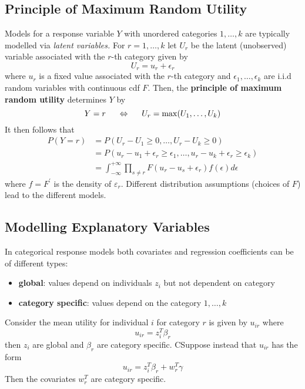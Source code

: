 \subsection{Principle of Maximum Random Utility}
Models for a response variable $Y$ with unordered categories $1,\dots,k$ are typically modelled via \textit{latent variables.} For $r=1,\dots,k$ let $U_r$ be the latent (unobserved) variable associated with the $r$-th category given by 
$$U_r = u_r + \epsilon_r$$
where $u_r$ is a fixed value associated with the $r$-th category and $\epsilon_1,\dots,\epsilon_k$ are i.i.d random variables with continuous cdf $F$. Then, the \textbf{principle of maximum random utility} determines $Y$ by 
$$Y = r \hspace{5mm} \iff \hspace{5mm} U_r = \max(U_1,\dots,U_k)$$
It then follows that 
\begin{align*}
    P(Y = r) &= P(U_r - U_1\geq0,\dots,U_r - U_k\geq0) \\
    &= P(u_r - u_1 + \epsilon_r \geq \epsilon_1,\dots,u_r - u_k + \epsilon_r \geq \epsilon_k) \\
    &= \int_{-\infty}^{+\infty}\prod_{s\neq r}F(u_r - u_s + \epsilon_r )f(\epsilon)d\epsilon
\end{align*}
where $f = F^\prime$ is the density of $\varepsilon_r$. Different distribution assumptions (choices of $F$) lead to the different models. 

\begin{eg}
    
\end{eg}


\subsection{Modelling Explanatory Variables}
In categorical response models both covariates and regression coefficients can be of different types: 
\begin{itemize}
    \item \textbf{global}: values depend on individuals $z_i$ but not dependent on category
    \item \textbf{category specific}: values depend on the category $1,\dots,k$
\end{itemize}

\begin{eg}
    Consider the mean utility for individual $i$ for category $r$ is given by $u_{ir}$ where 
    $$u_{ir} = z_i^T\beta_r$$
    then $z_i$ are global and $\beta_r$ are category specific. CSuppose instead that $u_{ir}$ has the form
    $$u_{ir} = z_i^T\beta_r + w_r^T\gamma$$
    Then the covariates $w_r^T$ are category specific.
\end{eg}


